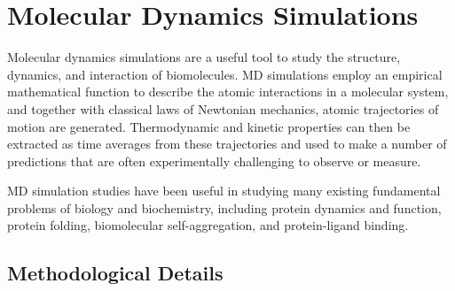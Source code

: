 \chapter{Molecular Dynamics Simulations}
\begin{outline}
\1 Molecular dynamics simulations are a useful tool to study the structure, dynamics, and interaction of biomolecules. MD simulations employ an empirical mathematical function to describe the atomic interactions in a molecular system, and together with classical laws of Newtonian mechanics, atomic trajectories of motion are generated. Thermodynamic and kinetic properties can then be extracted as time averages from these trajectories and used to make a number of predictions that are often experimentally challenging to observe or measure.

\1 MD simulation studies have been useful in studying many existing fundamental problems of biology and biochemistry, including protein dynamics and function, protein folding, biomolecular self-aggregation, and protein-ligand binding.
\end{outline}

\section{Methodological Details} %



